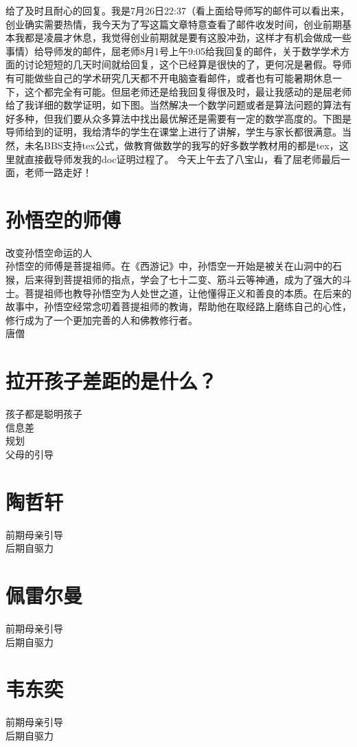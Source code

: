 \documentclass[12pt,twiside,a4paper]{ctexbook}
\numberwithin{chapter}{part}
\begin{document}
给了及时且耐心的回复。我是7月26日22:37（看上面给导师写的邮件可以看出来，创业确实需要热情，我今天为了写这篇文章特意查看了邮件收发时间，创业前期基本我都是凌晨才休息，我觉得创业前期就是要有这股冲劲，这样才有机会做成一些事情）给导师发的邮件，屈老师8月1号上午9:05给我回复的邮件，关于数学学术方面的讨论短短的几天时间就给回复，这个已经算是很快的了，更何况是暑假。导师有可能做些自己的学术研究几天都不开电脑查看邮件，或者也有可能暑期休息一下，这个都完全有可能。但屈老师还是给我回复得很及时，最让我感动的是屈老师给了我详细的数学证明，如下图。当然解决一个数学问题或者是算法问题的算法有好多种，但我们要从众多算法中找出最优解还是需要有一定的数学高度的。下图是导师给到的证明，我给清华的学生在课堂上进行了讲解，学生与家长都很满意。当然，未名BBS支持tex公式，做教育做数学的我写的好多数学教材用的都是tex，这里就直接截导师发我的doc证明过程了。    今天上午去了八宝山，看了屈老师最后一面，老师一路走好！
\section{孙悟空的师傅}
改变孙悟空命运的人\\
孙悟空的师傅是菩提祖师。在《西游记》中，孙悟空一开始是被关在山洞中的石猴，后来得到菩提祖师的指点，学会了七十二变、筋斗云等神通，成为了强大的斗士。菩提祖师也教导孙悟空为人处世之道，让他懂得正义和善良的本质。在后来的故事中，孙悟空经常念叨着菩提祖师的教诲，帮助他在取经路上磨练自己的心性，修行成为了一个更加完善的人和佛教修行者。\\
唐僧
\section{拉开孩子差距的是什么？}
孩子都是聪明孩子\\
信息差\\
规划\\
父母的引导

\section{陶哲轩}
前期母亲引导\\
后期自驱力

\section{佩雷尔曼}
前期母亲引导\\
后期自驱力

\section{韦东奕}
前期母亲引导\\
后期自驱力
\end{document}
